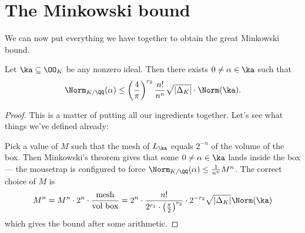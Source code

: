 \section{The Minkowski bound}
We can now put everything we have together to obtain the great Minkowski bound.
\begin{theorem}
	Let $\ka \subseteq \OO_K$ be any nonzero ideal.
	Then there exists $0 \neq \alpha \in \ka$ such that
	\[ \Norm_{K/\QQ}(\alpha) \le \left( \frac 4\pi \right)^{r_2} \frac{n!}{n^n} \sqrt{\left\lvert \Delta_K \right\rvert}
	\cdot \Norm(\ka). \]
\end{theorem}
\begin{proof}
	This is a matter of putting all our ingredients together.
	Let's see what things we've defined already:
	\begin{center}
	\end{center}
	Pick a value of $M$ such that the mesh of $L_\ka$
	equals $2^{-n}$ of the volume of the box.
	Then Minkowski's theorem gives that some $0 \neq \alpha \in \ka$ lands inside the box ---
	the mousetrap is configured to force $\Norm_{K/\QQ}(\alpha) \le \frac{1}{n^n} M^n$.
	The correct choice of $M$ is
	\[
		M^n
		= M^n \cdot 2^n \cdot \frac{\text{mesh}}{\text{vol box}}
		= 2^n \cdot \frac{n!}{2^{r_1} \cdot \left( \frac \pi 2 \right)^{r_2}}
		\cdot 2^{-r_2} \sqrt{\left\lvert \Delta_K \right\rvert} \Norm(\ka)
	\]
	which gives the bound after some arithmetic.
\end{proof}


